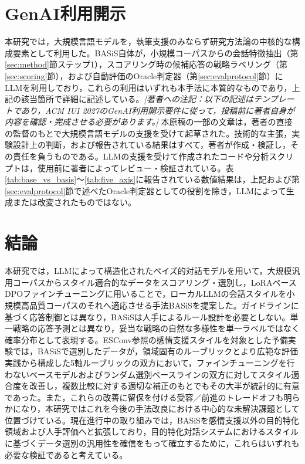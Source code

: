 \documentclass[manuscript,review,anonymous]{acmart}
\begin{document}
\section*{GenAI利用開示}
本研究では，大規模言語モデルを，執筆支援のみならず研究方法論の中核的な構成要素として利用した。BASiS自体が，小規模コーパスからの会話特徴抽出（第\ref{sec:method}節ステップ1），スコアリング時の候補応答の戦略ラベリング（第\ref{sec:scoring}節），および自動評価のOracle判定器（第\ref{sec:evalprotocol}節）にLLMを利用しており，これらの利用はいずれも本手法に本質的なものであり，上記の該当箇所で詳細に記述している。\emph{[著者への注記：以下の記述はテンプレートであり，ACM IUI 2027のGenAI利用開示要件に従って，投稿前に著者自身が内容を確認・完成させる必要があります。]} 本原稿の一部の文章は，著者の直接の監督のもとで大規模言語モデルの支援を受けて起草された。技術的な主張，実験設計上の判断，および報告されている結果はすべて，著者が作成・検証し，その責任を負うものである。LLMの支援を受けて作成されたコードや分析スクリプトは，使用前に著者によってレビュー・検証されている。表\ref{tab:base_vs_basis}〜\ref{tab:five_axis}に報告されている数値結果は，上記および第\ref{sec:evalprotocol}節で述べたOracle判定器としての役割を除き，LLMによって生成または改変されたものではない。


\section{結論}
本研究では，LLMによって構造化されたベイズ的対話モデルを用いて，大規模汎用コーパスからスタイル適合的なデータをスコアリング・選別し，LoRAベースDPOファインチューニングに用いることで，ローカルLLMの会話スタイルを小規模高品質コーパスのそれへ適応させる手法BASiSを提案した。ガイドラインに基づく応答制御とは異なり，BASiSは人手によるルール設計を必要としない。単一戦略の応答予測とは異なり，妥当な戦略の自然な多様性を単一ラベルではなく確率分布として表現する。ESConv参照の感情支援スタイルを対象とした予備実験では，BASiSで選別したデータが，領域固有のルーブリックとより広範な評価実践から構成した5軸ルーブリックの双方において，ファインチューニングを行わないベースモデルおよびランダム選別ベースラインの双方に対してスタイル適合度を改善し，複数比較に対する適切な補正のもとでもその大半が統計的に有意であった。また，これらの改善に留保を付ける受容／前進のトレードオフも明らかになり，本研究ではこれを今後の手法改良における中心的な未解決課題として位置づけている。現在進行中の取り組みでは，BASiSを感情支援以外の目的特化領域および人手評価へと拡張しており，目的特化対話システムにおけるスタイルに基づくデータ選別の汎用性を確信をもって確立するために，これらはいずれも必要な検証であると考えている。




\end{document}
